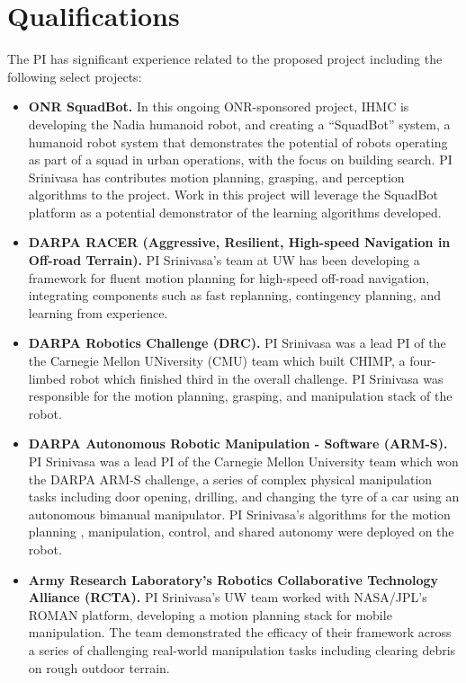 \documentclass[10pt]{article}
\begin{document}
\section{Qualifications}
The PI has significant experience related to the proposed project including the following select projects:
\begin{itemize}
    \item \textbf{ONR SquadBot.} In this ongoing ONR-sponsored project, IHMC is developing the Nadia humanoid robot, and creating a “SquadBot” system, a humanoid robot system that demonstrates the potential of robots operating as part of a squad in urban operations, with the focus on building search. PI Srinivasa has contributes motion planning, grasping, and perception algorithms to the project. Work in this project will leverage the SquadBot platform as a potential demonstrator of the learning algorithms developed.
    \item \textbf{DARPA RACER (Aggressive, Resilient, High-speed Navigation in Off-road Terrain).} PI Srinivasa’s team at UW has been developing a framework for fluent motion planning for high-speed off-road navigation, integrating components such as fast replanning, contingency planning, and learning from experience.
    \item \textbf{DARPA Robotics Challenge (DRC).} PI Srinivasa was a lead PI of the the Carnegie Mellon UNiversity (CMU) team which built CHIMP, a four-limbed robot  which finished third in the overall challenge. PI Srinivasa was responsible for the motion planning, grasping, and manipulation stack of the robot.
    \item \textbf{DARPA Autonomous Robotic Manipulation - Software (ARM-S).} PI Srinivasa was a lead PI of the Carnegie Mellon University team which won the DARPA ARM-S challenge, a series of complex physical manipulation tasks including door opening, drilling, and changing the tyre of a car using an autonomous bimanual manipulator. PI Srinivasa's algorithms for the motion planning , manipulation, control, and shared autonomy were deployed on the robot.
    \item \textbf{Army Research Laboratory’s Robotics Collaborative Technology Alliance (RCTA).} PI Srinivasa’s UW team worked with NASA/JPL’s ROMAN platform, developing a motion planning stack for mobile manipulation. The team demonstrated the efficacy of their framework across a series of challenging real-world manipulation tasks including clearing debris on rough outdoor terrain. 
\end{itemize}

\newpage
 

\end{document}
